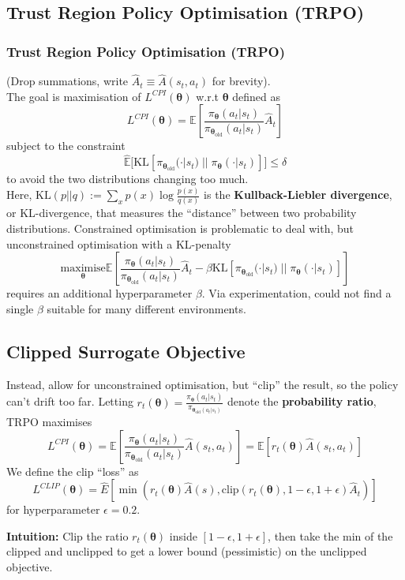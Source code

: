 \documentclass[10pt,a4paper]{beamer}
\newcommand{\bth}{{\boldsymbol{\theta}}}
\newcommand{\Ex}{\mathbb{E}}
\begin{document}
\subsection{Trust Region Policy Optimisation (TRPO)}
\begin{frame}
	\frametitle{Trust Region Policy Optimisation (TRPO)}
	(Drop summations, write $\hat{A}_t \equiv \hat{A}(s_t,a_t)$ for brevity).\\
	The goal is maximisation of $L^{CPI}(\bth)$ w.r.t $\bth$ defined as
	$$
	L^{CPI}(\bth) = \Ex \left[ 
	\frac{\pi_\bth(a_t | s_t)}{\pi_{\bth_\text{old}}(a_t | s_t)} \hat{A}_t \right]
	$$
	subject to the constraint 
	$$
	\hat{\Ex} \bigg[ \text{KL}[\pi_{\bth_\text{old}}(\cdot | s_t)\; ||\; 
	\pi_\bth(\cdot | s_t)] \bigg] \leq \delta 
	$$
	to avoid the two distributions changing too much. \\
	\pause
	Here, $\text{KL}(p||q) := \sum_x p(x) \log \frac{p(x)}{q(x)}$ is the 
	\textbf{Kullback-Liebler divergence}, or KL-divergence, that measures
	the ``distance'' between two probability distributions.
	\pause
	Constrained optimisation is problematic to deal with, but unconstrained
	optimisation with a KL-penalty
	$$
	\underset{\bth}{\text{maximise}}
	\Ex \left[ \frac{\pi_\bth(a_t | s_t)}{\pi_{\bth_\text{old}}(a_t | s_t)} 
	\hat{A}_t - \beta \text{KL}[\pi_{\bth_\text{old}}(\cdot | s_t)\; ||\; 
	\pi_\bth(\cdot | s_t)]  \right]
	$$
	requires an additional hyperparameter $\beta$. Via experimentation, could not find
	a single $\beta$ suitable for many different environments.
\end{frame}

\subsection{Clipped Surrogate Objective}
\begin{frame}
	Instead, allow for unconstrained optimisation, but ``clip'' the result, so the
	policy can't drift too far.
	\pause
	Letting $r_t(\bth) = \frac{\pi_\bth(a_t | s_t)}{\pi_{\bth_{\text{old}}(a_t|s_t)}}$
	denote the \textbf{probability ratio}, TRPO maximises 
	$$
	L^{CPI}(\bth) = \Ex \left[ \frac{\pi_\bth(a_t | s_t)}{\pi_{\bth_\text{old}}(a_t | s_t)} \hat{A}(s_t, a_t) \right]
	= \Ex \left[ r_t(\bth) \hat{A}(s_t, a_t) \right]
	$$
	\pause
	We define the clip ``loss'' as
	$$
	L^{CLIP}(\bth) = \hat{E}
	\left[
	\min(r_t(\bth) \hat{A}(s), 
	\text{clip}(r_t(\bth), 1-\epsilon, 1+\epsilon) \hat{A}_t )
	\right]
	$$
	for hyperparameter $\epsilon = 0.2$.
	\pause 
	
	\textbf{Intuition:} Clip the ratio $r_t(\bth)$ inside $[1-\epsilon,1+\epsilon]$,
	then take the min of the clipped and unclipped to get a lower bound (pessimistic)
	on the unclipped objective.
\end{frame}
\end{document}
